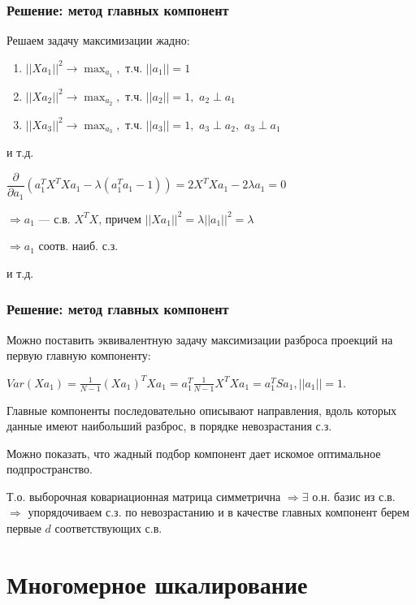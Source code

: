 \documentclass[10pt]{beamer}
\begin{document}
\begin{frame}
\frametitle{Решение: метод главных компонент}

Решаем задачу максимизации жадно:

\begin{enumerate}
	\item $||Xa_1||^{2} \rightarrow \max_{a_1},$ т.ч. $||a_1|| = 1$
	\item $||Xa_2||^{2} \rightarrow \max_{a_2},$ т.ч. $||a_2|| = 1,$ $a_2 \perp a_1$
	\item $||Xa_3||^{2} \rightarrow \max_{a_3},$ т.ч. $||a_3|| = 1,$ $a_3 \perp a_2,$ $a_3 \perp a_1$
\end{enumerate}
и т.д.


$ \dfrac{\partial}{\partial a_1} (a_{1}^{T}X^T Xa_1 - \lambda (a_1^T a_1 - 1)) = 2X^{T}Xa_1 - 2\lambda a_1 =  0 $

$\Rightarrow a_1$ --- с.в. $X^{T} X$, причем $||Xa_1||^2 = \lambda ||a_1||^{2} = \lambda$ 

$\Rightarrow a_1$ соотв. наиб. с.з.

и т.д.


\end{frame}

\begin{frame}
\frametitle{Решение: метод главных компонент}

Можно поставить эквивалентную задачу максимизации разброса проекций на первую главную компоненту:

\vspace{\baselineskip}
$Var(Xa_1) = \frac{1}{N - 1} (Xa_1)^T Xa_1 = a_1^T \frac{1}{N - 1} X^T X a_1 = a_1^T S a_1, ||a_1|| = 1$. 

\vspace{\baselineskip}
Главные компоненты последовательно описывают направления, вдоль которых данные имеют наибольший разброс, в порядке невозрастания с.з.

Можно показать, что жадный подбор компонент дает искомое оптимальное подпространство.

\vspace{\baselineskip}
Т.о. выборочная ковариационная матрица симметрична $\Rightarrow \exists$ о.н. базис из с.в. $\Rightarrow$ упорядочиваем с.з. по невозрастанию и в качестве главных компонент берем первые $d$ соответствующих с.в.

\end{frame}
\section{Многомерное шкалирование}
\end{document}
